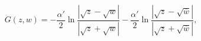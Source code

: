 \begin{equation}
G(z,w)=-\frac{\alpha '}{2}\ln
\frac{|\sqrt{z}-\sqrt{w}|}{|\sqrt{z}+\sqrt{w}|}-\frac{\alpha '}{2}\ln
\frac{|\sqrt{z}-\sqrt{\overline{w}}|}{|\sqrt{z}+\sqrt{\overline{w}}|},
\end{equation}

